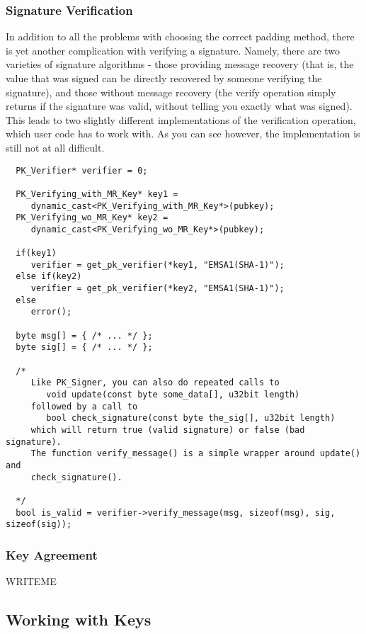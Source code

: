 \documentclass{article}
\begin{document}
\pagebreak

\subsubsection{Signature Verification}

In addition to all the problems with choosing the correct padding method,
there is yet another complication with verifying a signature. Namely, there are
two varieties of signature algorithms - those providing message recovery (that
is, the value that was signed can be directly recovered by someone verifying
the signature), and those without message recovery (the verify operation simply
returns if the signature was valid, without telling you exactly what was
signed). This leads to two slightly different implementations of the
verification operation, which user code has to work with. As you can see
however, the implementation is still not at all difficult.

\begin{verbatim}
  PK_Verifier* verifier = 0;

  PK_Verifying_with_MR_Key* key1 =
     dynamic_cast<PK_Verifying_with_MR_Key*>(pubkey);
  PK_Verifying_wo_MR_Key* key2 =
     dynamic_cast<PK_Verifying_wo_MR_Key*>(pubkey);

  if(key1)
     verifier = get_pk_verifier(*key1, "EMSA1(SHA-1)");
  else if(key2)
     verifier = get_pk_verifier(*key2, "EMSA1(SHA-1)");
  else
     error();

  byte msg[] = { /* ... */ };
  byte sig[] = { /* ... */ };

  /*
     Like PK_Signer, you can also do repeated calls to
        void update(const byte some_data[], u32bit length)
     followed by a call to
        bool check_signature(const byte the_sig[], u32bit length)
     which will return true (valid signature) or false (bad signature).
     The function verify_message() is a simple wrapper around update() and
     check_signature().

  */
  bool is_valid = verifier->verify_message(msg, sizeof(msg), sig, sizeof(sig));
\end{verbatim}

\subsubsection{Key Agreement}

WRITEME

\pagebreak

\subsection{Working with Keys}
\end{document}
